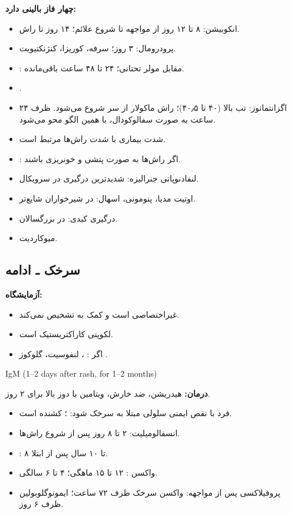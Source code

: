 \documentclass[12pt,a4paper]{article}
\begin{document}
\textbf{چهار فاز بالینی دارد:}
\begin{itemize}
\item انکوبیشن: ۸ تا ۱۲ روز از مواجهه تا شروع علائم؛ ۱۴ روز تا راش.
\item پرودرومال: ۳ روز؛ سرفه، کوریزا، کنژنکتیویت.
\item {}: مقابل مولر تحتانی؛ ۲۴ تا ۴۸ ساعت باقی‌مانده.
\item {}.
\item اگزانتماتوز: تب بالا (۴۰ تا ۴۰٫۵)؛ راش ماکولار از سر شروع می‌شود.
ظرف ۲۴ ساعت به صورت سفالوکودال، با همین الگو محو می‌شود.
\end{itemize}
\begin{itemize}
\item شدت بیماری با شدت راش‌ها مرتبط است.
\item {}: اگر راش‌ها به صورت پتشی و خونریزی باشند.
\item لنفادنوپاتی جنرالیزه: شدیدترین درگیری در سرویکال.
\item اوتیت مدیا، پنومونی، اسهال: در شیرخواران شایع‌تر.
\item درگیری کبدی: در بزرگسالان.
\item میوکاردیت.
\end{itemize}

\subsection*{سرخک ـ ادامه}
\textbf{آزمایشگاه:}
\begin{itemize}
\item غیراختصاصی است و کمک به تشخیص نمی‌کند.
\item لکوپنی کاراکتریستیک است.
\item اگر : \FRmath{\uparrow}، \FRmath{\uparrow} لنفوسیت، گلوکوز .
\end{itemize}
\begin{latin}
IgM (1--2 days after rash, for 1--2 months)
\end{latin}
\textbf{درمان:} هیدریشن، ضد خارش، ویتامین  با دوز بالا برای ۲ روز.
\begin{itemize}
\item فرد با نقص ایمنی سلولی مبتلا به سرخک شود: ؛ کشنده است.
\item انسفالومیلیت: ۲ تا ۸ روز پس از شروع راش‌ها.
\item {}: ۸ تا ۱۰ سال پس از ابتلا.
\item واکسن : ۱۲ تا ۱۵ ماهگی؛ ۴ تا ۶ سالگی.
\item پروفیلاکسی پس از مواجهه: واکسن سرخک ظرف ۷۲ ساعت؛ ایمونوگلوبولین ظرف ۶ روز.
\end{itemize}
\end{document}
